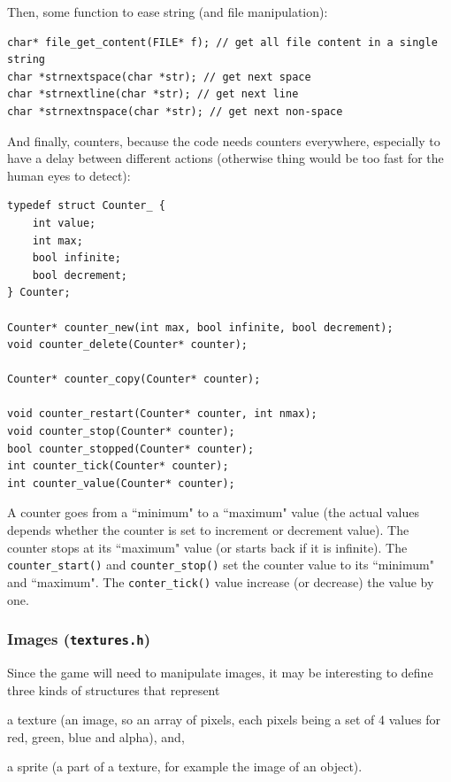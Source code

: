 \documentclass[12pt,a4paper]{article}
\newcommand{\cc}[1]{\texttt{#1}}
\begin{document}
Then, some function to ease string (and file manipulation):

\begin{verbatim}
char* file_get_content(FILE* f); // get all file content in a single string
char *strnextspace(char *str); // get next space
char *strnextline(char *str); // get next line
char *strnextnspace(char *str); // get next non-space
\end{verbatim}

And finally, counters, because the code needs counters everywhere, especially to have a delay between different actions (otherwise thing would be too fast for the human eyes to detect): 

\begin{verbatim}
typedef struct Counter_ {
    int value;
    int max;
    bool infinite;
    bool decrement;
} Counter;

Counter* counter_new(int max, bool infinite, bool decrement);
void counter_delete(Counter* counter);

Counter* counter_copy(Counter* counter);

void counter_restart(Counter* counter, int nmax);
void counter_stop(Counter* counter);
bool counter_stopped(Counter* counter);
int counter_tick(Counter* counter);
int counter_value(Counter* counter);
\end{verbatim}

A counter goes from a ``minimum" to a ``maximum" value (the actual values depends whether the counter is set to increment or decrement value). The counter stops at its ``maximum" value (or starts back if it is infinite). The \cc{counter_start()} and \cc{counter_stop()} set the counter value to its ``minimum" and ``maximum". The \cc{conter_tick()} value increase (or decrease) the value by one.

\subsubsection{Images (\texttt{textures.h})}

Since the game will need to manipulate images, it may be interesting to define three kinds of structures that represent \begin{inparaenum}[i)]
\item a texture (an image, so an array of pixels, each pixels being a set of 4 values for red, green, blue and alpha), and,
\item a sprite (a part of a texture, for example the image of an object).
\end{inparaenum}
\end{document}
